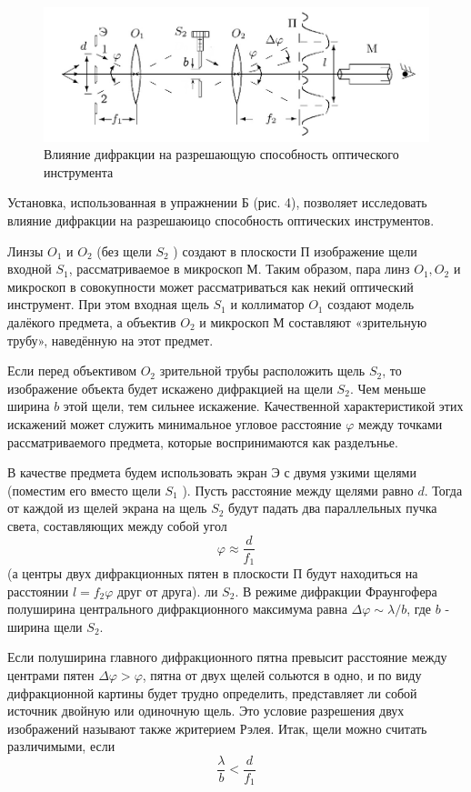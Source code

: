 \documentclass[a4paper, 12pt]{article}
\begin{document}
\begin{figure}[H]
    \centering
    \includegraphics[width=1\textwidth]{razresh.jpg}
    \caption{Влияние дифракции на разрешающую способность оптического инструмента}
    \label{fig:ris4}
\end{figure}

Установка, использованная в упражнении Б (рис. 4), позволяет исследовать влияние дифракции на разрешаюицо способность оптических инструментов.

Линзы $O_1$ и $O_2$ (без щели $S_2$ ) создают в плоскости П изображение щели входной $S_1$, рассматриваемое в микроскоп М. Таким образом, пара линз $O_1, O_2$ и микроскоп в совокупности может рассматриваться как некий оптический инструмент. При этом входная щель $S_1$ и коллиматор $O_1$ создают модель далёкого предмета, а объектив $O_2$ и микроскоп М составляют «зрительную трубу», наведённую на этот предмет.

Если перед объективом $O_2$ зрительной трубы расположить щель $S_2$, то изображение объекта будет искажено дифракцией на щели $S_2$. Чем меньше ширина $b$ этой щели, тем сильнее искажение. Качественной характеристикой этих искажений может служить минимальное угловое расстояние $\varphi$ между точками рассматриваемого предмета, которые воспринимаются как разделънье.

В качестве предмета будем использовать экран $\text{Э}$ с двумя узкими щелями (поместим его вместо щели $S_1$ ). Пусть расстояние между щелями равно $d$. Тогда от каждой из щелей экрана на щель $S_2$ будут падать два параллельных пучка света, составляющих между собой угол
\begin{equation*}
\varphi \approx \frac{d}{f_1}
\end{equation*}
(а центры двух дифракционных пятен в плоскости П будут находиться на расстоянии $l=f_2 \varphi$ друг от друга). ли $S_2$. В режиме дифракции Фраунгофера полуширина центрального дифракционного максимума равна $\Delta \varphi \sim \lambda / b$, где $b$ - ширина щели $S_2$.

Если полуширина главного дифракционного пятна превысит расстояние между центрами пятен $\Delta \varphi>\varphi$, пятна от двух щелей сольются в одно, и по виду дифракционной картины будет трудно определить, представляет ли собой источник двойную или одиночную щель. Это условие разрешения двух изображений называют также жритерием Рэлея. Итак, щели можно считать различимыми, если
\begin{equation*}
\frac{\lambda}{b}<\frac{d}{f_1}
\end{equation*}
\end{document}

